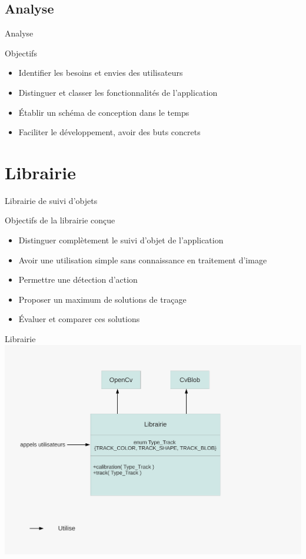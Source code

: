 \documentclass{beamer}
\begin{document}
	\subsection{Analyse}
		\begin{frame}{Analyse}
			\begin{exampleblock}{Objectifs}
				\begin{itemize}
					\item{Identifier les besoins et envies des utilisateurs}
					\item{Distinguer et classer les fonctionnalités de l'application}
					\item{Établir un schéma de conception dans le temps}
					\item{Faciliter le développement, avoir des buts concrets}
				\end{itemize}
			\end{exampleblock}
		\end{frame}
	
	\section{Librairie}
		\begin{frame}{Librairie de suivi d'objets}
			\begin{block}{Objectifs de la librairie conçue}
				\begin{itemize}
				\item{Distinguer complètement le suivi d'objet de l'application}
				\item{Avoir une utilisation simple sans connaissance en traitement d'image}
				\item{Permettre une détection d'action}
				\item{Proposer un maximum de solutions de traçage}
				\item{Évaluer et comparer ces solutions}
				\end{itemize}
			\end{block}
		\end{frame}

		\begin{frame}{Librairie}
			\includegraphics[scale=0.40]{schema-librairie.pdf}
		\end{frame}
\end{document}
